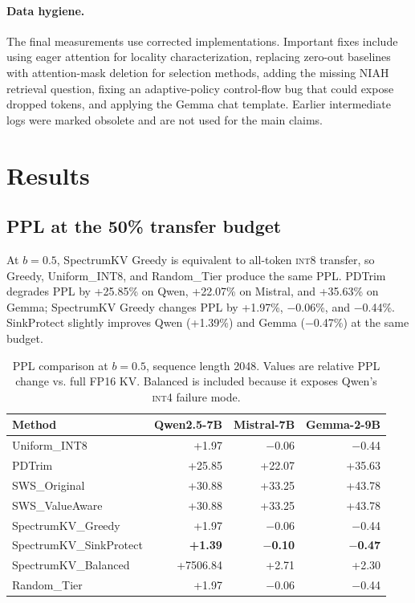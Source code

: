 \documentclass[11pt]{article}
\newcommand{\method}{SpectrumKV}
\newcommand{\niah}{NIAH}
\newcommand{\budget}{b}
\newcommand{\pct}{\%}
\newcommand{\intviii}{\textsc{int8}}
\newcommand{\intiv}{\textsc{int4}}
\theoremstyle{plain}
\theoremstyle{definition}
\begin{document}
\paragraph{Data hygiene.}
The final measurements use corrected implementations.  Important fixes include using eager attention for locality characterization, replacing zero-out baselines with attention-mask deletion for selection methods, adding the missing \niah{} retrieval question, fixing an adaptive-policy control-flow bug that could expose dropped tokens, and applying the Gemma chat template.  Earlier intermediate logs were marked obsolete and are not used for the main claims.

\section{Results}
\label{sec:results}

\subsection{PPL at the 50\pct{} transfer budget}
\label{sec:rq7}

At $\budget=0.5$, \method{} Greedy is equivalent to all-token \intviii{} transfer, so Greedy, Uniform\_INT8, and Random\_Tier produce the same PPL.  PDTrim degrades PPL by +25.85\pct{} on Qwen, +22.07\pct{} on Mistral, and +35.63\pct{} on Gemma; \method{} Greedy changes PPL by +1.97\pct{}, $-$0.06\pct{}, and $-$0.44\pct{}.  SinkProtect slightly improves Qwen (+1.39\pct{}) and Gemma ($-$0.47\pct{}) at the same budget.

\begin{table}[t]
\centering
\caption{PPL comparison at $\budget=0.5$, sequence length 2048.  Values are relative PPL change vs. full FP16 KV.  Balanced is included because it exposes Qwen's \intiv{} failure mode.}
\label{tab:ppl50}
\small
\begin{tabular}{lrrr}
\toprule
Method & Qwen2.5-7B & Mistral-7B & Gemma-2-9B \\
\midrule
Uniform\_INT8 & +1.97 & $-$0.06 & $-$0.44 \\
PDTrim & +25.85 & +22.07 & +35.63 \\
SWS\_Original & +30.88 & +33.25 & +43.78 \\
SWS\_ValueAware & +30.88 & +33.25 & +43.78 \\
\method{}\_Greedy & +1.97 & $-$0.06 & $-$0.44 \\
\method{}\_SinkProtect & \textbf{+1.39} & \textbf{$-$0.10} & \textbf{$-$0.47} \\
\method{}\_Balanced & +7506.84 & +2.71 & +2.30 \\
Random\_Tier & +1.97 & $-$0.06 & $-$0.44 \\
\bottomrule
\end{tabular}
\end{table}
\end{document}
